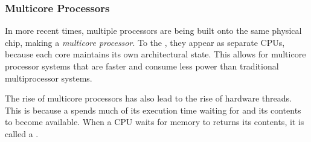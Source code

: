 \subsubsection{Multicore Processors}\label{subsubsec:Multicore_Processors}
In more recent times, multiple processors are being built onto the same physical chip, making a \emph{multicore processor}.
To the , they appear as separate CPUs, because each core maintains its own architectural state.
This allows for multicore processor systems that are faster and consume less power than traditional multiprocessor systems.

The rise of multicore processors has also lead to the rise of hardware threads.
This is because a  spends much of its execution time waiting for  and its contents to become available.
When a CPU waits for memory to returns its contents, it is called a .

